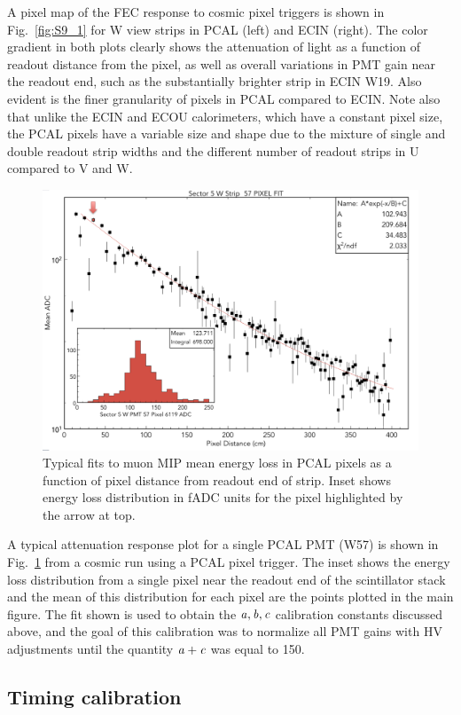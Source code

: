 A pixel map of the FEC response to cosmic pixel triggers is shown in Fig.~\ref{fig:S9_1} for W view strips in PCAL (left) and ECIN (right). The color gradient in both plots clearly shows the attenuation of light as a function of readout distance from the pixel, as well as overall variations in PMT gain near the readout end, such as the substantially brighter strip in ECIN W19.  Also evident is the finer granularity of pixels in PCAL compared to ECIN.  Note also that unlike the ECIN and ECOU calorimeters, which have a constant pixel size, the PCAL pixels have a variable size and shape due to the mixture of single and double readout strip widths and the different number of readout strips in U compared to V and W. 
\begin{figure}[hbt]
\centering
\includegraphics[width=1.0\columnwidth,keepaspectratio]{img/S9_2.png}
\caption[]{Typical fits to muon MIP mean energy loss in PCAL pixels as a function of pixel distance from readout end of strip. Inset shows energy loss distribution in fADC units for the pixel highlighted by the arrow at top.}
\label{fig:S9_2}
\end{figure}

A typical attenuation response plot for a single PCAL PMT (W57) is shown in Fig.~\ref{fig:S9_2} from a cosmic run using a PCAL pixel trigger.  The inset shows the energy loss distribution from a single pixel near the readout end of the scintillator stack and the mean of this distribution for each pixel are the points plotted in the main figure.  The fit shown is used to obtain the $\it{a,b,c}$ calibration constants discussed above, and the goal of this calibration was to normalize all PMT gains with HV adjustments until the quantity $\it{a+c}$ was equal to 150.  

\subsection{Timing calibration}




